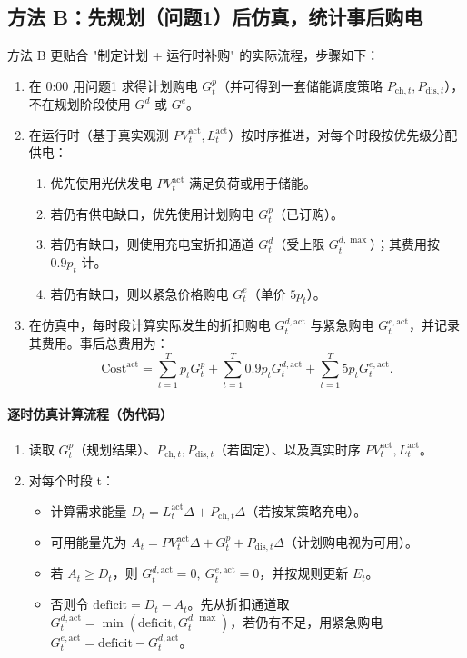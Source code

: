 \documentclass[12pt]{article}
\begin{document}
\subsection{方法 B：先规划（问题1）后仿真，统计事后购电}
方法 B 更贴合 "制定计划 + 运行时补购" 的实际流程，步骤如下：
\begin{enumerate}
  \item 在 0:00 用问题1 求得计划购电 $G^p_t$（并可得到一套储能调度策略 $P_{\mathrm{ch},t},P_{\mathrm{dis},t}$），不在规划阶段使用 $G^d$ 或 $G^e$。
  \item 在运行时（基于真实观测 $PV_t^{\mathrm{act}},L_t^{\mathrm{act}}$）按时序推进，对每个时段按优先级分配供电：
  \begin{enumerate}
    \item 优先使用光伏发电 $PV_t^{\mathrm{act}}$ 满足负荷或用于储能。
    \item 若仍有供电缺口，优先使用计划购电 $G^p_t$（已订购）。
    \item 若仍有缺口，则使用充电宝折扣通道 $G^d_t$（受上限 $G^{d,\max}_t$）；其费用按 $0.9p_t$ 计。
    \item 若仍有缺口，则以紧急价格购电 $G^e_t$（单价 $5p_t$）。
  \end{enumerate}
  \item 在仿真中，每时段计算实际发生的折扣购电 $G^{d,\mathrm{act}}_t$ 与紧急购电 $G^{e,\mathrm{act}}_t$，并记录其费用。事后总费用为：
  \begin{equation}
  \mathrm{Cost}^{\mathrm{act}} = \sum_{t=1}^T p_t G^p_t + \sum_{t=1}^T 0.9p_t G^{d,\mathrm{act}}_t + \sum_{t=1}^T 5p_t G^{e,\mathrm{act}}_t.
  \end{equation}
\end{enumerate}

\paragraph{逐时仿真计算流程（伪代码）}
\begin{enumerate}
  \item 读取 $G^p_t$（规划结果）、$P_{\mathrm{ch},t},P_{\mathrm{dis},t}$（若固定）、以及真实时序 $PV_t^{\mathrm{act}},L_t^{\mathrm{act}}$。
  \item 对每个时段 t：
  \begin{itemize}
    \item 计算需求能量 $D_t = L_t^{\mathrm{act}}\Delta + P_{\mathrm{ch},t}\Delta$（若按某策略充电）。
    \item 可用能量先为 $A_t = PV_t^{\mathrm{act}}\Delta + G^p_t + P_{\mathrm{dis},t}\Delta$（计划购电视为可用）。
    \item 若 $A_t\ge D_t$，则 $G^{d,\mathrm{act}}_t=0,\ G^{e,\mathrm{act}}_t=0$，并按规则更新 $E_t$。
    \item 否则令 $\mathrm{deficit}=D_t-A_t$。先从折扣通道取 $G^{d,\mathrm{act}}_t=\min(\mathrm{deficit},G^{d,\max}_t)$，若仍有不足，用紧急购电 $G^{e,\mathrm{act}}_t=\mathrm{deficit}-G^{d,\mathrm{act}}_t$。
  \end{itemize}
\end{enumerate}
\end{document}
